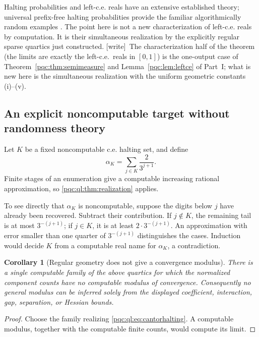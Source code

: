 \documentclass[11pt,letterpaper]{article}
\numberwithin{equation}{section}
\newtheorem{corollary}[theorem]{Corollary}
\theoremstyle{definition}
\theoremstyle{remark}
\newcommand{\wtag}{\textup{[write]}}
\begin{document}
Halting probabilities and left-c.e. reals have an extensive established
theory; universal prefix-free halting probabilities provide the familiar
algorithmically random examples \cite{b62s13-barmpalias}. The point here is not a
new characterization of left-c.e. reals by computation. It is their
simultaneous realization by the explicitly regular sparse quartics just
constructed. \wtag\ The characterization half of the theorem (the limits are exactly the left-c.e.\ reals in $[0,1]$) is the one-output case of Theorem~\ref{pqc:thm:semimeasure} and Lemma~\ref{pqc:lem:leftce} of Part~I; what is new here is the simultaneous realization with the uniform geometric constants (i)--(v).

\subsection{An explicit noncomputable target without randomness theory}
Let $K$ be a fixed noncomputable c.e. halting set, and define
\begin{equation}\label{pqc:ql:eq:cantorhalting}
 \alpha_K=\sum_{j\in K}\frac{2}{3^{j+1}}.
\end{equation}
Finite stages of an enumeration give a computable increasing rational
approximation, so \cref{pqc:ql:thm:realization} applies.

To see directly that $\alpha_K$ is noncomputable, suppose the digits below
$j$ have already been recovered. Subtract their contribution. If $j\notin
K$, the remaining tail is at most $3^{-(j+1)}$; if $j\in K$, it is at least
$2\cdot3^{-(j+1)}$. An approximation with error smaller than one quarter
of $3^{-(j+1)}$ distinguishes the cases. Induction would decide $K$ from
a computable real name for $\alpha_K$, a contradiction.

\begin{corollary}[Regular geometry does not give a convergence modulus]
There is a single computable family of the above quartics for which the
normalized component counts have no computable modulus of convergence.
Consequently no general modulus can be inferred solely from the displayed
coefficient, interaction, gap, separation, or Hessian bounds.
\end{corollary}
\begin{proof}
Choose the family realizing \eqref{pqc:ql:eq:cantorhalting}. A computable modulus,
together with the computable finite counts, would compute its limit.
\end{proof}
\end{document}
